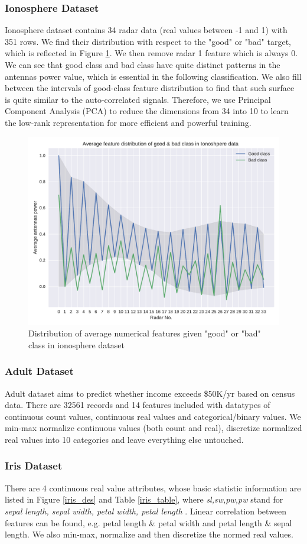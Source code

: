 \documentclass[11pt]{scrartcl}
\begin{document}
\subsubsection*{Ionosphere Dataset}
Ionosphere dataset contains 34 radar data (real values between -1 and 1) with 351 rows\cite{sigillito1989classification}. We find their distribution with respect to the "good" or "bad" target, which is reflected in Figure \ref{iono_feat}. We then remove radar 1 feature which is always 0. We can see that good class and bad class have quite distinct patterns in the antennas power value, which is essential in the following classification. We also fill between the intervals of good-class feature distribution to find that such surface is quite similar to the auto-correlated signals. Therefore, we use Principal Component Analysis (PCA) to reduce the dimensions from 34 into 10 to learn the low-rank representation for more efficient and powerful training.

\begin{figure}[t]
	\centering
	\includegraphics[width=0.6\linewidth]{fig/iono_feat_dist.pdf}
	\caption{Distribution of average numerical features given "good" or "bad" class in ionosphere dataset}
	\label{iono_feat}
\end{figure}

\subsubsection*{Adult Dataset}
Adult dataset aims to predict whether income exceeds \$50K/yr based on census data\cite{kohavi1996scaling}. There are 32561 records and 14 features included with datatypes of continuous count values, continuous real values and categorical/binary values. We min-max normalize continuous values (both count and real),  discretize normalized real values into 10 categories and leave everything else untouched.


\subsubsection*{Iris Dataset}
There are 4 continuous real value attributes, whose basic statistic information are listed in Figure \ref{iris_des} and Table \ref{iris_table}, where \textit{sl,sw,pw,pw} stand for \textit{sepal length, sepal width, petal width, petal length} \cite{fisher1936use}. Linear correlation between features can be found, e.g. petal length \& petal width and petal length \& sepal length. We also min-max, normalize and then discretize the normed real values.
\end{document}
